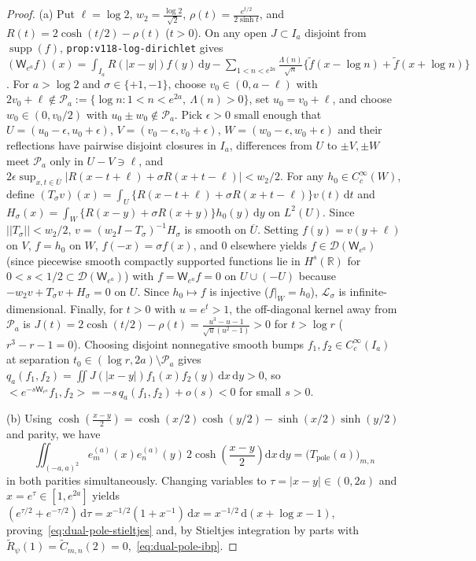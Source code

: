 \documentclass[11pt]{article}
\def\norm#1{||#1||}%
\def\ip#1#2{<#1,#2>}%
\theoremstyle{remark}
\newcommand{\norm}[1]{\left\lVert #1\right\rVert}
\newcommand{\ip}[2]{\left\langle #1,#2\right\rangle}
\newcommand{\dd}{\mathrm d}
\begin{document}
\begin{proof}
(a) Put $\ell = \log 2$, $w_2 = \frac{\log 2}{\sqrt{2}}$, $\rho(t) = \frac{e^{t/2}}{2\sinh t}$, and $R(t) = 2\cosh(t/2) - \rho(t)$ ($t > 0$). On any open $J \subset I_a$ disjoint from $\operatorname{supp}(f)$, \texttt{prop:v118-log-dirichlet} gives $(\mathsf{W}_{e^a}f)(x) = \int_{I_a} R(|x-y|)f(y)\,\dd y - \sum_{1<n<e^{2a}}\frac{\Lambda(n)}{\sqrt{n}}\{\widetilde{f}(x-\log n)+\widetilde{f}(x+\log n)\}$. For $a > \log 2$ and $\sigma \in \{+1,-1\}$, choose $v_0 \in (0, a-\ell)$ with $2v_0 + \ell \notin \mathcal{P}_a := \{\log n : 1 < n < e^{2a},\ \Lambda(n) > 0\}$, set $u_0 = v_0 + \ell$, and choose $w_0 \in (0, v_0/2)$ with $u_0 \pm w_0 \notin \mathcal{P}_a$. Pick $\epsilon > 0$ small enough that $U = (u_0-\epsilon, u_0+\epsilon)$, $V = (v_0-\epsilon, v_0+\epsilon)$, $W = (w_0-\epsilon, w_0+\epsilon)$ and their reflections have pairwise disjoint closures in $I_a$, differences from $U$ to $\pm V, \pm W$ meet $\mathcal{P}_a$ only in $U - V \ni \ell$, and $2\epsilon\sup_{x,t\in\overline{U}}|R(x-t+\ell)+\sigma R(x+t-\ell)| < w_2/2$. For any $h_0 \in C_c^\infty(W)$, define $(T_\sigma v)(x) = \int_U \{R(x-t+\ell)+\sigma R(x+t-\ell)\}v(t)\,\dd t$ and $H_\sigma(x) = \int_W \{R(x-y)+\sigma R(x+y)\}h_0(y)\,\dd y$ on $L^2(U)$. Since $\norm{T_\sigma} < w_2/2$, $v = (w_2 I - T_\sigma)^{-1}H_\sigma$ is smooth on $\overline{U}$. Setting $f(y) = v(y+\ell)$ on $V$, $f = h_0$ on $W$, $f(-x) = \sigma f(x)$, and $0$ elsewhere yields $f \in \mathcal{D}(\mathsf{W}_{e^a})$ (since piecewise smooth compactly supported functions lie in $H^s(\mathbb{R})$ for $0 < s < 1/2 \subset \mathcal{D}(\mathsf{W}_{e^a})$) with $f = \mathsf{W}_{e^a}f = 0$ on $U \cup (-U)$ because $-w_2 v + T_\sigma v + H_\sigma = 0$ on $U$. Since $h_0 \mapsto f$ is injective ($f|_W = h_0$), $\mathcal{L}_\sigma$ is infinite-dimensional. Finally, for $t > 0$ with $u = e^t > 1$, the off-diagonal kernel away from $\mathcal{P}_a$ is $J(t) = 2\cosh(t/2) - \rho(t) = \frac{u^3 - u - 1}{\sqrt{u}(u^2 - 1)} > 0$ for $t > \log r$ ($r^3 - r - 1 = 0$). Choosing disjoint nonnegative smooth bumps $f_1, f_2 \in C_c^\infty(I_a)$ at separation $t_0 \in (\log r, 2a) \setminus \mathcal{P}_a$ gives $q_a(f_1, f_2) = \iint J(|x-y|)f_1(x)f_2(y)\,\dd x\,\dd y > 0$, so $\ip{e^{-s\mathsf{W}_{e^a}}f_1}{f_2} = -s\,q_a(f_1,f_2) + o(s) < 0$ for small $s > 0$.

(b) Using $\cosh(\frac{x-y}{2}) = \cosh(x/2)\cosh(y/2) - \sinh(x/2)\sinh(y/2)$ and parity, we have
\[
  \iint_{(-a,a)^2} e_m^{(a)}(x)e_n^{(a)}(y)\,2\cosh\!\left(\frac{x-y}{2}\right)\dd x\,\dd y = \bigl(T_{\mathrm{pole}}(a)\bigr)_{m,n}
\]
in both parities simultaneously. Changing variables to $\tau = |x-y| \in (0,2a)$ and $x = e^\tau \in [1,e^{2a}]$ yields $(e^{\tau/2} + e^{-\tau/2})\,\dd\tau = x^{-1/2}(1 + x^{-1})\,\dd x = x^{-1/2}\,\dd(x + \log x - 1)$, proving~\eqref{eq:dual-pole-stieltjes} and, by Stieltjes integration by parts with $\widetilde{R}_\psi(1) = \widetilde{C}_{m,n}(2) = 0$,~\eqref{eq:dual-pole-ibp}.


\end{proof}
\end{document}
